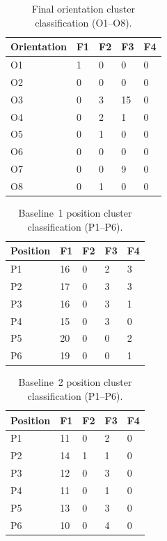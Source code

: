 \documentclass[12pt,a4paper]{report}
\begin{document}
\begin{table}[htbp]
  \centering
  \caption{Final orientation cluster classification (O1--O8).}
  \label{tab:final-orientation-clusters}
  \begin{tabular}{lllll}
    \toprule
    Orientation & F1 & F2 & F3 & F4 \\
    \midrule
    O1 & 1 & 0 &  0 & 0 \\
    O2 & 0 & 0 &  0 & 0 \\
    O3 & 0 & 3 & 15 & 0 \\
    O4 & 0 & 2 &  1 & 0 \\
    O5 & 0 & 1 &  0 & 0 \\
    O6 & 0 & 0 &  0 & 0 \\
    O7 & 0 & 0 &  9 & 0 \\
    O8 & 0 & 1 &  0 & 0 \\
    \bottomrule
  \end{tabular}
\end{table}

\begin{table}[htbp]
  \centering
  \caption{Baseline~1 position cluster classification (P1--P6).}
  \label{tab:baseline1-position-clusters}
  \begin{tabular}{lllll}
    \toprule
    Position & F1 & F2 & F3 & F4 \\
    \midrule
    P1 & 16 & 0 & 2 & 3 \\
    P2 & 17 & 0 & 3 & 3 \\
    P3 & 16 & 0 & 3 & 1 \\
    P4 & 15 & 0 & 3 & 0 \\
    P5 & 20 & 0 & 0 & 2 \\
    P6 & 19 & 0 & 0 & 1 \\
    \bottomrule
  \end{tabular}
\end{table}

\begin{table}[htbp]
  \centering
  \caption{Baseline~2 position cluster classification (P1--P6).}
  \label{tab:baseline2-position-clusters}
  \begin{tabular}{lllll}
    \toprule
    Position & F1 & F2 & F3 & F4 \\
    \midrule
    P1 & 11 & 0 & 2 & 0 \\
    P2 & 14 & 1 & 1 & 0 \\
    P3 & 12 & 0 & 3 & 0 \\
    P4 & 11 & 0 & 1 & 0 \\
    P5 & 13 & 0 & 3 & 0 \\
    P6 & 10 & 0 & 4 & 0 \\
    \bottomrule
  \end{tabular}
\end{table}
\end{document}
